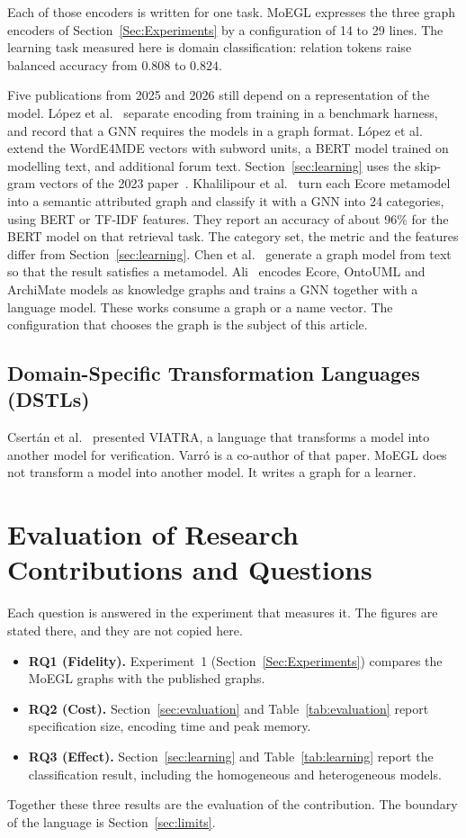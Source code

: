 \documentclass[journal,article,submit,moreauthors,technologies]{Definitions/mdpi}
\newcommand{\rev}[1]{#1}
\begin{document}
\rev{Each of those encoders is written for one task. MoEGL expresses the three graph encoders of Section~\ref{Sec:Experiments} by a configuration of 14 to 29 lines. The learning task measured here is domain classification: relation tokens raise balanced accuracy from $0.808$ to $0.824$.}

\rev{Five publications from 2025 and 2026 still depend on a representation of the model. L\'opez et al.~\cite{lopez2025modelxglue} separate encoding from training in a benchmark harness, and record that a GNN requires the models in a graph format. L\'opez et al.~\cite{lopez2025worde} extend the WordE4MDE vectors with subword units, a BERT model trained on modelling text, and additional forum text. Section~\ref{sec:learning} uses the skip-gram vectors of the 2023 paper~\cite{lopez2023word}. Khalilipour et al.~\cite{khalilipour2025retrieval} turn each Ecore metamodel into a semantic attributed graph and classify it with a GNN into 24 categories, using BERT or TF-IDF features. They report an accuracy of about 96\% for the BERT model on that retrieval task. The category set, the metric and the features differ from Section~\ref{sec:learning}. Chen et al.~\cite{chen2025graphgen} generate a graph model from text so that the result satisfies a metamodel. Ali~\cite{ali2026symbols} encodes Ecore, OntoUML and ArchiMate models as knowledge graphs and trains a GNN together with a language model. These works consume a graph or a name vector. The configuration that chooses the graph is the subject of this article.}

\subsection{Domain-Specific Transformation Languages (DSTLs)}
\rev{Csert\'an et al.~\cite{csertan2002viatra} presented VIATRA, a language that transforms a model into another model for verification. Varr\'o is a co-author of that paper. MoEGL does not transform a model into another model. It writes a graph for a learner.}


\section{Evaluation of Research Contributions and Questions}
\rev{Each question is answered in the experiment that measures it. The figures are stated there, and they are not copied here.}
\begin{itemize}
    \item \rev{\textbf{RQ1 (Fidelity).} Experiment~1 (Section~\ref{Sec:Experiments}) compares the MoEGL graphs with the published graphs.}
    \item \rev{\textbf{RQ2 (Cost).} Section~\ref{sec:evaluation} and Table~\ref{tab:evaluation} report specification size, encoding time and peak memory.}
    \item \rev{\textbf{RQ3 (Effect).} Section~\ref{sec:learning} and Table~\ref{tab:learning} report the classification result, including the homogeneous and heterogeneous models.}
\end{itemize}
\rev{Together these three results are the evaluation of the contribution. The boundary of the language is Section~\ref{sec:limits}.}
\end{document}
